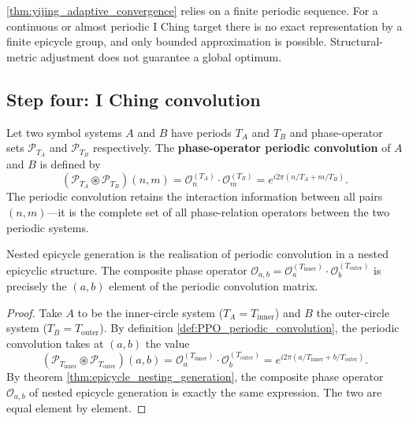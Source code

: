 \begin{remark}\label{rem:yijing_adaptive_boundary}
\cref{thm:yijing_adaptive_convergence} relies on a finite periodic sequence. For a continuous or almost periodic I Ching target there is no exact representation by a finite epicycle group, and only bounded approximation is possible. Structural-metric adjustment does not guarantee a global optimum.
\end{remark}

\subsection{Step four: I Ching convolution}

\begin{definition}\label{def:PPO_periodic_convolution}
Let two symbol systems $A$ and $B$ have periods $T_A$ and $T_B$ and phase-operator sets $\mathcal{P}_{T_A}$ and $\mathcal{P}_{T_B}$ respectively. The \textbf{phase-operator periodic convolution} of $A$ and $B$ is defined by
\[
(\mathcal{P}_{T_A} \circledast \mathcal{P}_{T_B})(n, m) = \mathcal{O}_n^{(T_A)} \cdot \mathcal{O}_m^{(T_B)} = e^{i2\pi(n/T_A + m/T_B)}.
\]
The periodic convolution retains the interaction information between all pairs $(n,m)$---it is the complete set of all phase-relation operators between the two periodic systems.
\end{definition}

\begin{proposition}\label{prop:periodic_conv_epicycle_consistency}
Nested epicycle generation is the realisation of periodic convolution in a nested epicyclic structure. The composite phase operator $\mathcal{O}_{a,b} = \mathcal{O}_a^{(T_{\text{inner}})} \cdot \mathcal{O}_b^{(T_{\text{outer}})}$ is precisely the $(a,b)$ element of the periodic convolution matrix.
\end{proposition}

\begin{proof}
Take $A$ to be the inner-circle system ($T_A = T_{\text{inner}}$) and $B$ the outer-circle system ($T_B = T_{\text{outer}}$). By definition \ref{def:PPO_periodic_convolution}, the periodic convolution takes at $(a,b)$ the value
\[
(\mathcal{P}_{T_{\text{inner}}} \circledast \mathcal{P}_{T_{\text{outer}}})(a,b) = \mathcal{O}_a^{(T_{\text{inner}})} \cdot \mathcal{O}_b^{(T_{\text{outer}})} = e^{i2\pi(a/T_{\text{inner}} + b/T_{\text{outer}})}.
\]
By theorem \ref{thm:epicycle_nesting_generation}, the composite phase operator $\mathcal{O}_{a,b}$ of nested epicycle generation is exactly the same expression. The two are equal element by element.
\end{proof}

